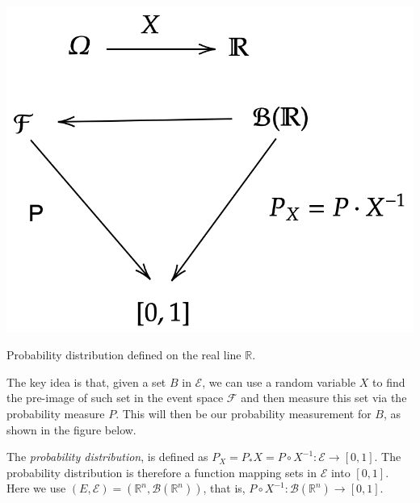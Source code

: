 \documentclass{tufte-handout}
\begin{document}
\begin{marginfigure}
\centering
\includegraphics{fig/diag1.png}

\caption{Probability distribution defined on the real line $\mathbb R$.
}
\end{marginfigure}


The key idea is that, given a set $B$ in $\mathcal E$, we can use a random variable $X$
 to find the pre-image of such set in the event space $ \mathcal F$
 and then measure this set via the probability measure $P$. This will then be our probability measurement for 
 $B$, as shown in the figure below.
 
 The \textit{probability distribution},  is defined as $P_X =P_* X = P\circ X^{-1}: \mathcal E \rightarrow [0,1]$. 
 The probability distribution is therefore a function mapping sets in $\mathcal E$  into 
$[0,1]$. Here we use $(E, \mathcal E) = (\mathbb R^n,\mathcal B(\mathbb R^n))$, that is, 
$P\circ X^{-1}: \mathcal B(\mathbb R^n)  \rightarrow [0,1]$.
\end{document}
